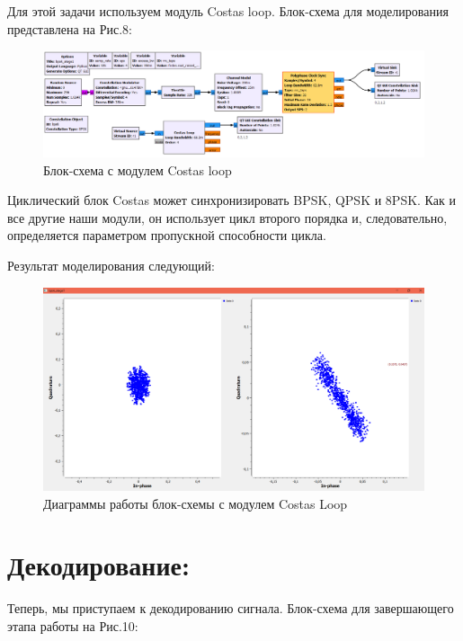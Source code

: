 \documentclass[12pt]{article}
\begin{document}
Для этой задачи используем модуль Costas loop. Блок-схема для моделирования представлена на Рис.8: 

\begin{figure}[H]
    \centering
    \includegraphics[width=1\textwidth]{pics/a0000-img008.png}
    \caption{Блок-схема с модулем Costas loop}
\end{figure}

Циклический блок Costas может синхронизировать BPSK, QPSK и 8PSK. Как и все другие наши модули, он использует цикл второго порядка и, следовательно, определяется параметром пропускной способности цикла. 

\pagebreak

Результат моделирования следующий:

\begin{figure}[H]
    \centering
    \includegraphics[width=1\textwidth]{pics/a0000-img009.png}
    \caption{Диаграммы работы блок-схемы с модулем Costas Loop}
\end{figure}


\section{Декодирование:}

Теперь, мы приступаем к декодированию сигнала. Блок-схема для завершающего этапа работы на Рис.10:
\end{document}
